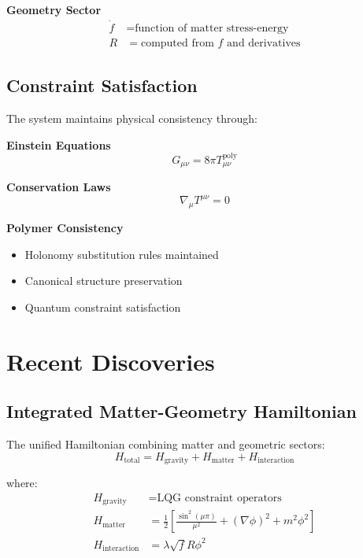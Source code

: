 \documentclass[11pt]{article}
\begin{document}
\textbf{Geometry Sector}
\begin{align}
\dot{f} &= \text{function of matter stress-energy} \\
R &= \text{computed from } f \text{ and derivatives}
\end{align}

\subsection{Constraint Satisfaction}

The system maintains physical consistency through:

\textbf{Einstein Equations}
\begin{equation}
G_{\mu\nu} = 8\pi T_{\mu\nu}^{\text{poly}}
\end{equation}

\textbf{Conservation Laws}
\begin{equation}
\nabla_\mu T^{\mu\nu} = 0
\end{equation}

\textbf{Polymer Consistency}
\begin{itemize}
\item Holonomy substitution rules maintained
\item Canonical structure preservation
\item Quantum constraint satisfaction
\end{itemize}

\section{Recent Discoveries}

\subsection{Integrated Matter-Geometry Hamiltonian}

The unified Hamiltonian combining matter and geometric sectors:
\begin{equation}
H_{\text{total}} = H_{\text{gravity}} + H_{\text{matter}} + H_{\text{interaction}}
\end{equation}

where:
\begin{align}
H_{\text{gravity}} &= \text{LQG constraint operators} \\
H_{\text{matter}} &= \frac{1}{2}\left[\frac{\sin^2(\mu\pi)}{\mu^2} + (\nabla\phi)^2 + m^2\phi^2\right] \\
H_{\text{interaction}} &= \lambda\sqrt{f}R\phi^2
\end{align}
\end{document}
